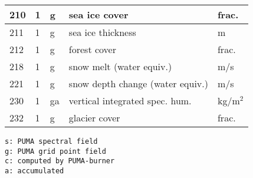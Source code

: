\begin{center}
\begin{tabular}[t]{|l|l|l|l|l|}
210 & 1    & g  & sea ice cover                    & frac.           \\ \hline
211 & 1    & g  & sea ice thickness                & m               \\ \hline
212 & 1    & g  & forest cover                     & frac.           \\ \hline
218 & 1    & g  & snow melt (water equiv.)         & m/s             \\ \hline
221 & 1    & g  & snow depth change (water equiv.) & m/s             \\ \hline
230 & 1    & ga & vertical integrated spec. hum.   & kg/m$^{2}$      \\ \hline
232 & 1    & g  & glacier cover                    & frac.           \\ \hline

\end{tabular}

\vspace*{0.5cm}

\begin{verbatim}
s: PUMA spectral field
g: PUMA grid point field
c: computed by PUMA-burner
a: accumulated
\end{verbatim}

\end{center}


%

